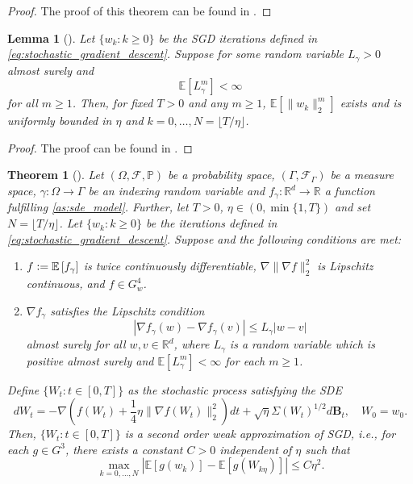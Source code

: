 \documentclass[12pt]{article}
\newtheorem{theorem}{Theorem}[section]
\newtheorem{lemma}[lemma]{Lemma}
\theoremstyle{definition}
\numberwithin{equation}{section}
\newcommand{\R}{\mathbb{R}}
\newcommand{\BP}{\mathbb{P}}
\newcommand{\CF}{\mathcal{F}}
\newcommand{\ev}[1]{\mathbb{E}\left[{#1}\right]}
\newcommand{\norm}[1]{\lVert{#1}\rVert_2}
\newcommand{\defeq}{\vcentcolon=}
\begin{document}
\begin{proof}
  The proof of this theorem can be found in \cite{liStochasticModifiedEquations2019}.
\end{proof}
\begin{lemma}[]
  \label{lemma:moment_bound}
  Let $\{w_k: k \geq 0 \}$ be the SGD iterations defined in \eqref{eq:stochastic_gradient_descent}. Suppose for some random variable $L_{\gamma} > 0$ almost surely and 
  \begin{equation*}
    \ev{L_{\gamma}^m} < \infty
  \end{equation*}
  for all $m \geq 1$. Then, for fixed $T > 0$ and any $m \geq 1$, $\ev{\norm{w_k}^m}$ exists and is uniformly bounded in $\eta$ and $k=0,\dots,N = \lfloor T / \eta \rfloor$.
\end{lemma}
\begin{proof}
  The proof can be found in \cite[Lemma 29]{liStochasticModifiedEquations2019}.
\end{proof}
\begin{theorem}[\autocite{liStochasticModifiedEquations2019}]
  \label{thm:second_order}
  Let $(\Omega, \CF, \BP)$ be a probability space, $(\Gamma, \CF_{\Gamma})$ be a measure space, $\gamma : \Omega \rightarrow \Gamma$ be an indexing random variable and $f_\gamma : \R^d \rightarrow \R$ a function fulfilling \autoref{as:sde_model}.
  Further, let $T > 0$, $\eta \in (0, \min\{1,T\})$ and set $N = \lfloor T/\eta \rfloor$. Let $\{w_k:k\geq 0\}$ be the iterations defined in \eqref{eq:stochastic_gradient_descent}. Suppose and the following conditions are met:
  \begin{enumerate}[label=(\roman*)]
    \item $f \defeq \ev{f_{\gamma}}$ is twice continuously differentiable, $\nabla \norm{\nabla f} ^2$ is Lipschitz continuous, and $f \in G^4_w$.
    \item $\nabla f_{\gamma}$ satisfies the Lipschitz condition
    \begin{equation*}
      |\nabla f_{\gamma}(w) - \nabla f_{\gamma}(v)| \leq L_{\gamma} |w - v|
    \end{equation*}
    almost surely for all $w,v \in \R^d$, where $L_{\gamma}$ is a random variable which is positive almost surely and $\ev{L_{\gamma}^m} < \infty$ for each $m \geq 1$.
  \end{enumerate}
  Define $\{W_t:t\in [0,T] \}$ as the stochastic process satisfying the SDE
  \begin{equation}
    \label{eq:second_order_sde}
    d W_t = -\nabla\left(f(W_t) + \frac{1}{4}\eta \norm{\nabla f(W_t)}^2\right)dt + \sqrt{\eta}\Sigma(W_t)^{1/2}d\mathbf{B}_t, \quad W_0 = w_0.
  \end{equation}
  Then, $\{W_t:t\in [0,T] \}$ is a second order weak approximation of SGD, i.e., for each $g \in G^3$, there exists a constant $C > 0$ independent of $\eta$ such that
  \begin{equation}
    \label{eq:second_order_convergence}
    \max_{k=0,\dots,N} |\ev{g(w_k)} - \ev{g(W_{k\eta})}| \leq C \eta^2.
  \end{equation}
\end{theorem}
\end{document}
